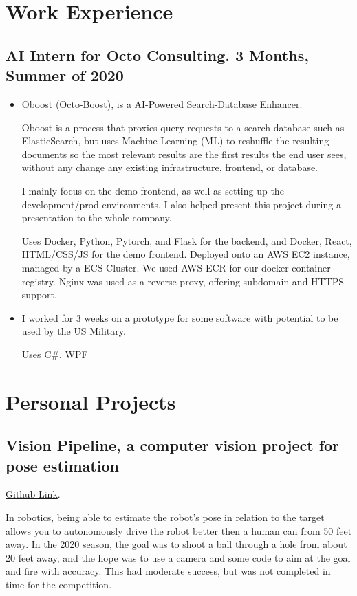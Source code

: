 \documentclass[10pt,letterpaper]{article}
\def\link#1#2{\color{blue!60!black}\href{#1}{#2}\color{black}}
\newcommand{\Csh}{C\#}
\def\paddedItem#1{\vspace{-0.4em}\item #1}
\begin{document}
    \section*{Work Experience}
    \subsection*{AI Intern for Octo Consulting. 3 Months, Summer of 2020}
    \begin{itemize}
        \paddedItem Oboost (Octo-Boost), is a AI-Powered Search-Database Enhancer.

        \hspace{24px} Oboost is a process that proxies query requests to a search database such as ElasticSearch,
        but uses Machine Learning (ML) to reshuffle the resulting documents so the most relevant results
        are the first results the end user sees, without any change any existing infrastructure, frontend, or database.
        
        \hspace{24px} I mainly focus on the demo frontend, as well as setting up the development/prod environments. 
        I also helped present this project during a presentation to the whole company. 

        Uses Docker, Python, Pytorch, and Flask for the backend, and Docker, React, HTML/CSS/JS for the demo frontend.
        Deployed onto an AWS EC2 instance, managed by a ECS Cluster. We used AWS ECR for our docker container registry.
        Nginx was used as a reverse proxy, offering subdomain and HTTPS support.

        \paddedItem I worked for 3 weeks on a prototype for some software with potential to be used by the US Military. 
        
        Uses \Csh, WPF
    \end{itemize}
    
    \section*{Personal Projects}

    \subsection*{Vision Pipeline, a computer vision project for pose estimation}
    \link{https://github.com/CougarProgramming623/vision-pipeline}{Github Link}. 
    
    In robotics, being able to estimate the robot's pose in relation to the target
    allows you to autonomously drive the robot better then a human can from 50 feet away.
    In the 2020 season, the goal was to shoot a ball through a hole from about 20 feet away,
    and the hope was to use a camera and some code to aim at the goal and fire with accuracy.
    This had moderate success, but was not completed in time for the competition.
\end{document}
